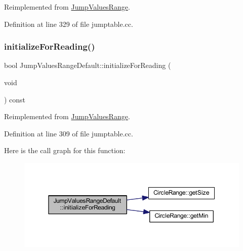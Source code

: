 Reimplemented from \mbox{\hyperlink{class_jump_values_range_a1652b9c2b1e6cedf3d80452cfe5aa37f}{Jump\+Values\+Range}}.



Definition at line 329 of file jumptable.\+cc.

\mbox{\label{class_jump_values_range_default_aa179eae73d98e8ce8f7fee639ef078ae}} 
\subsubsection{\texorpdfstring{initializeForReading()}{initializeForReading()}}
{\footnotesize\ttfamily bool Jump\+Values\+Range\+Default\+::initialize\+For\+Reading (\begin{DoxyParamCaption}\item[{void}]{ }\end{DoxyParamCaption}) const\hspace{0.3cm}{\ttfamily [virtual]}}



Reimplemented from \mbox{\hyperlink{class_jump_values_range_a92e0970fd19cd188a82078752a10948d}{Jump\+Values\+Range}}.



Definition at line 309 of file jumptable.\+cc.

Here is the call graph for this function\+:
\nopagebreak
\begin{figure}[H]
\begin{center}
\leavevmode
\includegraphics[width=350pt]{class_jump_values_range_default_aa179eae73d98e8ce8f7fee639ef078ae_cgraph}
\end{center}
\end{figure}
\mbox{\label{class_jump_values_range_default_ae8a65769bf7dbc7f257725c4cf755aa9}} 
